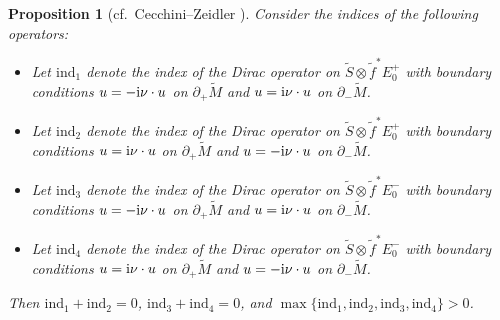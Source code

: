 \documentclass[pdftex]{sigma}
\numberwithin{equation}{section}
\newtheorem{Proposition}[Theorem]{Proposition}
 { \theoremstyle{definition}
\newtheorem{Definition}[Theorem]{Definition}
\newtheorem{Note}[Theorem]{Note}
\newtheorem{Example}[Theorem]{Example}
\newtheorem{Remark}[Theorem]{Remark} }
\begin{document}
\begin{Proposition}[cf.\ Cecchini--Zeidler \cite{Cecchini-Zeidler}]
\label{index_even_dim}
Consider the indices of the following operators:
\begin{itemize}\itemsep=0pt
\item Let $\mathrm{ind}_1$ denote the index of the Dirac operator on $\tilde{S} \otimes \tilde{f}^* E_0^+$ with boundary conditions $u = -{\rm i} \nu \cdot u$ on $\partial_+ \tilde{M}$ and $u = {\rm i} \nu \cdot u$ on $\partial_- \tilde{M}$.
\item Let $\mathrm{ind}_2$ denote the index of the Dirac operator on $\tilde{S} \otimes \tilde{f}^* E_0^+$ with boundary conditions $u = {\rm i} \nu \cdot u$ on $\partial_+ \tilde{M}$ and $u = -{\rm i} \nu \cdot u$ on $\partial_- \tilde{M}$.
\item Let $\mathrm{ind}_3$ denote the index of the Dirac operator on $\tilde{S} \otimes \tilde{f}^* E_0^-$ with boundary conditions $u = -{\rm i} \nu \cdot u$ on $\partial_+ \tilde{M}$ and $u = {\rm i} \nu \cdot u$ on $\partial_- \tilde{M}$.
\item Let $\mathrm{ind}_4$ denote the index of the Dirac operator on $\tilde{S} \otimes \tilde{f}^* E_0^-$ with boundary conditions $u = {\rm i} \nu \cdot u$ on $\partial_+ \tilde{M}$ and $u = -{\rm i} \nu \cdot u$ on $\partial_- \tilde{M}$.
\end{itemize}
Then $\mathrm{ind}_1+\mathrm{ind}_2 = 0$, $\mathrm{ind}_3+\mathrm{ind}_4 = 0$, and $\max \{\mathrm{ind}_1,\mathrm{ind}_2, \mathrm{ind}_3, \mathrm{ind}_4\} > 0$.
\end{Proposition}
\end{document}
